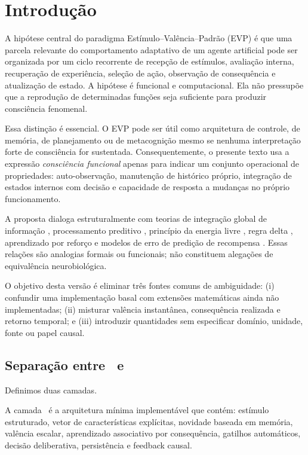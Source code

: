 \section{Introdução}

A hipótese central do paradigma Estímulo--Valência--Padrão (EVP) é que uma parcela relevante do comportamento adaptativo de um agente artificial pode ser organizada por um ciclo recorrente de recepção de estímulos, avaliação interna, recuperação de experiência, seleção de ação, observação de consequência e atualização de estado. A hipótese é funcional e computacional. Ela não pressupõe que a reprodução de determinadas funções seja suficiente para produzir consciência fenomenal.

Essa distinção é essencial. O EVP pode ser útil como arquitetura de controle, de memória, de planejamento ou de metacognição mesmo se nenhuma interpretação forte de consciência for sustentada. Consequentemente, o presente texto usa a expressão \emph{consciência funcional} apenas para indicar um conjunto operacional de propriedades: auto-observação, manutenção de histórico próprio, integração de estados internos com decisão e capacidade de resposta a mudanças no próprio funcionamento.

A proposta dialoga estruturalmente com teorias de integração global de informação \parencite{baars1988}, processamento preditivo \parencite{clark2016}, princípio da energia livre \parencite{friston2010}, regra delta \parencite{widrowhoff1960}, aprendizado por reforço \parencite{SuttonBarto2018} e modelos de erro de predição de recompensa \parencite{schultz1997}. Essas relações são analogias formais ou funcionais; não constituem alegações de equivalência neurobiológica.

O objetivo desta versão é eliminar três fontes comuns de ambiguidade: (i) confundir uma implementação basal com extensões matemáticas ainda não implementadas; (ii) misturar valência instantânea, consequência realizada e retorno temporal; e (iii) introduzir quantidades sem especificar domínio, unidade, fonte ou papel causal.

\subsection{Separação entre \EVPB\ e \EVPM}

Definimos duas camadas.

\begin{definition}
A camada \EVPB\ é a arquitetura mínima implementável que contém: estímulo estruturado, vetor de características explícitas, novidade baseada em memória, valência escalar, aprendizado associativo por consequência, gatilhos automáticos, decisão deliberativa, persistência e feedback causal.
\end{definition}

